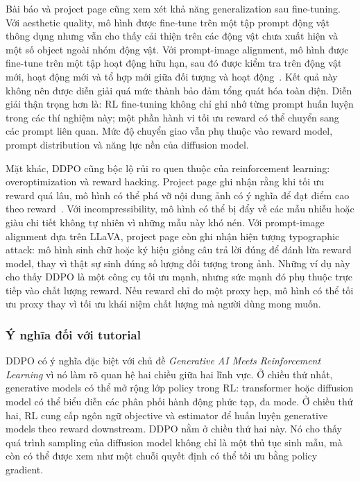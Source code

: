 Bài báo và project page cũng xem xét khả năng generalization sau fine-tuning.
Với aesthetic quality, mô hình được fine-tune trên một tập prompt động vật thông dụng nhưng vẫn cho thấy cải thiện trên các động vật chưa xuất hiện và một số object ngoài nhóm động vật.
Với prompt-image alignment, mô hình được fine-tune trên một tập hoạt động hữu hạn, sau đó được kiểm tra trên động vật mới, hoạt động mới và tổ hợp mới giữa đối tượng và hoạt động~\citep{black2024ddpoproject}.
Kết quả này không nên được diễn giải quá mức thành bảo đảm tổng quát hóa toàn diện.
Diễn giải thận trọng hơn là: RL fine-tuning không chỉ ghi nhớ từng prompt huấn luyện trong các thí nghiệm này; một phần hành vi tối ưu reward có thể chuyển sang các prompt liên quan.
Mức độ chuyển giao vẫn phụ thuộc vào reward model, prompt distribution và năng lực nền của diffusion model.

Mặt khác, DDPO cũng bộc lộ rủi ro quen thuộc của reinforcement learning: overoptimization và reward hacking.
Project page ghi nhận rằng khi tối ưu reward quá lâu, mô hình có thể phá vỡ nội dung ảnh có ý nghĩa để đạt điểm cao theo reward~\citep{black2024ddpoproject}.
Với incompressibility, mô hình có thể bị đẩy về các mẫu nhiễu hoặc giàu chi tiết không tự nhiên vì những mẫu này khó nén.
Với prompt-image alignment dựa trên LLaVA, project page còn ghi nhận hiện tượng typographic attack: mô hình sinh chữ hoặc ký hiệu giống câu trả lời đúng để đánh lừa reward model, thay vì thật sự sinh đúng số lượng đối tượng trong ảnh.
Những ví dụ này cho thấy DDPO là một công cụ tối ưu mạnh, nhưng sức mạnh đó phụ thuộc trực tiếp vào chất lượng reward.
Nếu reward chỉ đo một proxy hẹp, mô hình có thể tối ưu proxy thay vì tối ưu khái niệm chất lượng mà người dùng mong muốn.

\subsubsection*{Ý nghĩa đối với tutorial}

DDPO có ý nghĩa đặc biệt với chủ đề \textit{Generative AI Meets Reinforcement Learning} vì nó làm rõ quan hệ hai chiều giữa hai lĩnh vực.
Ở chiều thứ nhất, generative models có thể mở rộng lớp policy trong RL: transformer hoặc diffusion model có thể biểu diễn các phân phối hành động phức tạp, đa mode.
Ở chiều thứ hai, RL cung cấp ngôn ngữ objective và estimator để huấn luyện generative models theo reward downstream.
DDPO nằm ở chiều thứ hai này.
Nó cho thấy quá trình sampling của diffusion model không chỉ là một thủ tục sinh mẫu, mà còn có thể được xem như một chuỗi quyết định có thể tối ưu bằng policy gradient.

